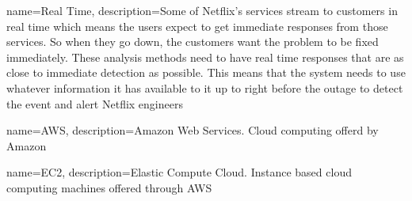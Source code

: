 \documentclass[12pt]{ucthesis}
\begin{document}
      {name={Real Time},
       description={Some of Netflix's services stream to customers in real time which means the
                    users expect to get immediate responses from those services. So when
                    they go down, the customers want the problem to be fixed immediately. These
                    analysis methods need to have real time responses that are as close to
                    immediate detection as possible. This means that the system needs to use
                    whatever information it has available to it up to right before the outage to
                    detect the event and alert Netflix engineers}}

      {name={AWS},
       description={Amazon Web Services. Cloud computing offerd by Amazon}}

      {name={EC2},
       description={Elastic Compute Cloud. Instance based cloud computing machines offered through AWS}}

\glsaddall
{}
\printglossaries

\clearpage


\end{document}
